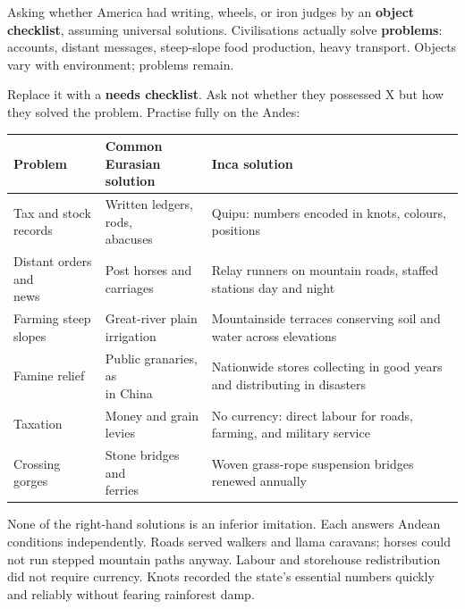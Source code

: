Asking whether America had writing, wheels, or iron judges by an \textbf{object checklist}, assuming universal solutions. Civilisations actually solve \textbf{problems}: accounts, distant messages, steep-slope food production, heavy transport. Objects vary with environment; problems remain.

Replace it with a \textbf{needs checklist}. Ask not whether they possessed X but how they solved the problem. Practise fully on the Andes:

\noindent
\begin{tabularx}{\linewidth}{llX}
\toprule
Problem & \shortstack[l]{Common Eurasian\\ solution} & Inca solution \\
\midrule
\shortstack[l]{Tax and stock\\ records} & \shortstack[l]{Written ledgers, rods,\\ abacuses} & Quipu: numbers encoded in knots, colours, positions \\
\shortstack[l]{Distant orders and\\ news} & \shortstack[l]{Post horses and\\ carriages} & Relay runners on mountain roads, staffed stations day and night \\
\shortstack[l]{Farming steep\\ slopes} & \shortstack[l]{Great-river plain\\ irrigation} & Mountainside terraces conserving soil and water across elevations \\
Famine relief & \shortstack[l]{Public granaries, as\\ in China} & Nationwide stores collecting in good years and distributing in disasters \\
Taxation & Money and grain levies & No currency: direct labour for roads, farming, and military service \\
Crossing gorges & \shortstack[l]{Stone bridges and\\ ferries} & Woven grass-rope suspension bridges renewed annually \\
\bottomrule
\end{tabularx}

\smallskip
None of the right-hand solutions is an inferior imitation. Each answers Andean conditions independently. Roads served walkers and llama caravans; horses could not run stepped mountain paths anyway. Labour and storehouse redistribution did not require currency. Knots recorded the state's essential numbers quickly and reliably without fearing rainforest damp.

